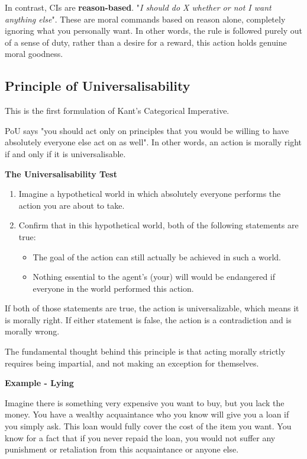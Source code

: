 \documentclass[12pt]{article}
\begin{document}
\noindent In contrast, CIs are \textbf{reason-based}.
"\textit{I should do X whether or not I want anything else}".
These are moral commands based on reason alone, completely ignoring what you personally want.
In other words, the rule is followed purely out of a sense of duty, rather than a desire for a reward, this action holds genuine moral goodness.

\subsection{Principle of Universalisability}
This is the first formulation of Kant's Categorical Imperative.

\noindent PoU says "you should act only on principles that you would be willing to have absolutely everyone else act on as well".
In other words, an action is morally right if and only if it is universalisable.

\noindent\textbf{The Universalisability Test}
\begin{enumerate}
    \item Imagine a hypothetical world in which absolutely everyone performs the action you are about to take.
    \item Confirm that in this hypothetical world, both of the following statements are true:
    \begin{itemize}
        \item The goal of the action can still actually be achieved in such a world.
        \item Nothing essential to the agent’s (your) will would be endangered if everyone in the world performed this action.
    \end{itemize}
\end{enumerate}
If both of those statements are true, the action is universalizable, which means it is morally right. 
If either statement is false, the action is a contradiction and is morally wrong.

\noindent The fundamental thought behind this principle is that acting morally strictly requires being impartial, and not making an exception for themselves.

\noindent\textbf{Example - Lying}

\noindent Imagine there is something very expensive you want to buy, but you lack the money.
You have a wealthy acquaintance who you know will give you a loan if you simply ask.
This loan would fully cover the cost of the item you want.
You know for a fact that if you never repaid the loan, you would not suffer any punishment or retaliation from this acquaintance or anyone else.
\end{document}
